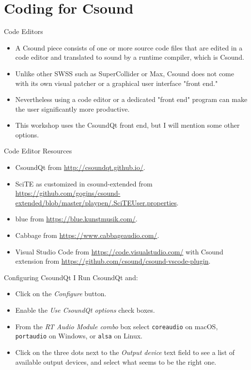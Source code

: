 \documentclass{beamer}
\begin{document}
    \section{Coding for Csound}
    \begin{frame}{Code Editors}
        \begin{itemize}
            \item A Csound piece consists of one or more source code files that are
            edited in a code editor and translated to sound by a runtime compiler, which is
            Csound.
            \item Unlike other SWSS such as SuperCollider or Max, Csound does not
            come with its own visual patcher or a graphical user interface "front end."
            \item Nevertheless using a code editor or a dedicated "front end"
            program can make the user significantly more productive.
            \item This workshop uses the CsoundQt front end, but I will mention some
            other options.
        \end{itemize}
    \end{frame}
    \begin{frame}{Code Editor Resources}
        \begin{itemize}
            \item CsoundQt from \url{http://csoundqt.github.io/}.
            \item SciTE as customized in csound-extended from
            \url{https://github.com/gogins/csound-extended/blob/master/playpen/.SciTEUser.properties}.
            \item blue from \url{https://blue.kunstmusik.com/}.
            \item Cabbage from \url{https://www.cabbageaudio.com/}.
            \item Visual Studio Code from \url{https://code.visualstudio.com/} with
            Csound extension from \url{https://github.com/csound/csound-vscode-plugin}.
        \end{itemize}
    \end{frame}
    \begin{frame}{Configuring CsoundQt I}
        Run CsoundQt and:
        \begin{itemize}
            \item Click on the \textit{Configure} button. 
            \item Enable the \textit{Use CsoundQt options} check boxes.
            \item From the \textit{RT Audio Module combo} box select
            \texttt{coreaudio} on macOS, \texttt{portaudio} on Windows, or \texttt{alsa} on
            Linux.
            \item Click on the three dots next to the \textit{Output device} text
            field to see a list of available output devices, and select what seems to be the
            right one.
        \end{itemize}
    \end{frame}
\end{document}
